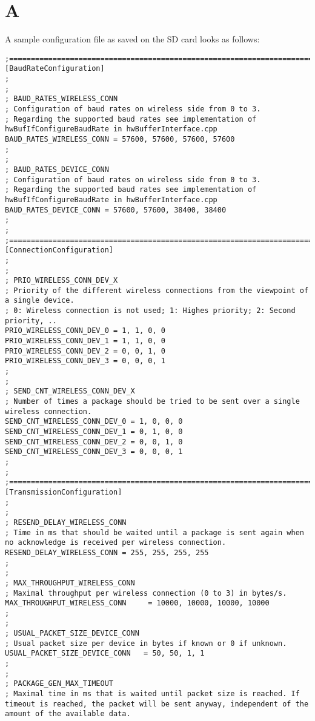 %
\chapter{A}\label{app:txtConfigFile}
A sample configuration file as saved on the SD card looks as follows:
\begin{lstlisting}
;===================================================================================================================================
[BaudRateConfiguration]
;
;
; BAUD_RATES_WIRELESS_CONN
; Configuration of baud rates on wireless side from 0 to 3.
; Regarding the supported baud rates see implementation of hwBufIfConfigureBaudRate in hwBufferInterface.cpp
BAUD_RATES_WIRELESS_CONN = 57600, 57600, 57600, 57600
;
;
; BAUD_RATES_DEVICE_CONN
; Configuration of baud rates on wireless side from 0 to 3.
; Regarding the supported baud rates see implementation of hwBufIfConfigureBaudRate in hwBufferInterface.cpp
BAUD_RATES_DEVICE_CONN = 57600, 57600, 38400, 38400
;
;
;===================================================================================================================================
[ConnectionConfiguration]
;
;
; PRIO_WIRELESS_CONN_DEV_X
; Priority of the different wireless connections from the viewpoint of a single device.
; 0: Wireless connection is not used; 1: Highes priority; 2: Second priority, ..
PRIO_WIRELESS_CONN_DEV_0 = 1, 1, 0, 0
PRIO_WIRELESS_CONN_DEV_1 = 1, 1, 0, 0
PRIO_WIRELESS_CONN_DEV_2 = 0, 0, 1, 0
PRIO_WIRELESS_CONN_DEV_3 = 0, 0, 0, 1
;
;
; SEND_CNT_WIRELESS_CONN_DEV_X
; Number of times a package should be tried to be sent over a single wireless connection.
SEND_CNT_WIRELESS_CONN_DEV_0 = 1, 0, 0, 0
SEND_CNT_WIRELESS_CONN_DEV_1 = 0, 1, 0, 0
SEND_CNT_WIRELESS_CONN_DEV_2 = 0, 0, 1, 0
SEND_CNT_WIRELESS_CONN_DEV_3 = 0, 0, 0, 1
;
;
;===================================================================================================================================
[TransmissionConfiguration]
;
;
; RESEND_DELAY_WIRELESS_CONN
; Time in ms that should be waited until a package is sent again when no acknowledge is received per wireless connection.
RESEND_DELAY_WIRELESS_CONN = 255, 255, 255, 255
;
;
; MAX_THROUGHPUT_WIRELESS_CONN
; Maximal throughput per wireless connection (0 to 3) in bytes/s.
MAX_THROUGHPUT_WIRELESS_CONN	 = 10000, 10000, 10000, 10000
;
;
; USUAL_PACKET_SIZE_DEVICE_CONN
; Usual packet size per device in bytes if known or 0 if unknown.
USUAL_PACKET_SIZE_DEVICE_CONN	= 50, 50, 1, 1
;
;
; PACKAGE_GEN_MAX_TIMEOUT
; Maximal time in ms that is waited until packet size is reached. If timeout is reached, the packet will be sent anyway, independent of the amount of the available data.

\end{lstlisting}
